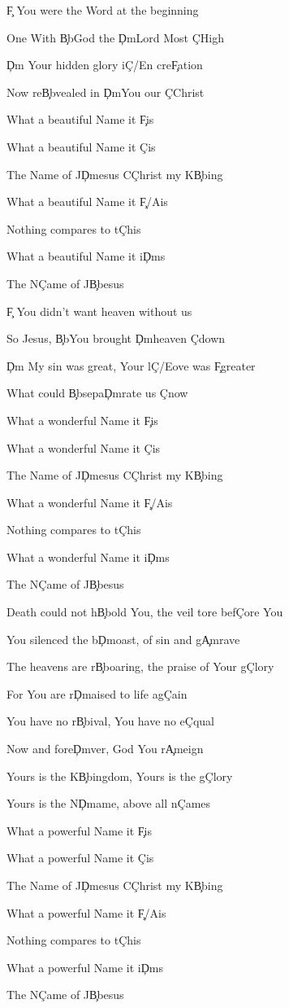 \documentclass[9pt]{extarticle}
\begin{document}
\bsong

\bv
\c{F} You were the Word at the beginning

One With \c{Bb}God the \c{Dm}Lord Most \c{C}High

\c{Dm} Your hidden glory i\c{C/E}n cre\c{F}ation

Now re\c{Bb}vealed in \c{Dm}You our \c{C}Christ
\ev

\bc
What a beautiful Name it \c{F}is

What a beautiful Name it \c{C}is

The Name of J\c{Dm}esus C\c{C}hrist my K\c{Bb}ing

What a beautiful Name it \c{F/A}is

Nothing compares to t\c{C}his

What a beautiful Name it i\c{Dm}s

The N\c{C}ame of J\c{Bb}esus
\ec

\bv
\c{F} You didn't want heaven without us

So Jesus, \c{Bb}You brought \c{Dm}heaven \c{C}down

\c{Dm} My sin was great, Your l\c{C/E}ove was \c{F}greater

What could \c{Bb}sepa\c{Dm}rate us \c{C}now
\ev

\bc
What a wonderful Name it \c{F}is

What a wonderful Name it \c{C}is

The Name of J\c{Dm}esus C\c{C}hrist my K\c{Bb}ing

What a wonderful Name it \c{F/A}is

Nothing compares to t\c{C}his

What a wonderful Name it i\c{Dm}s

The N\c{C}ame of J\c{Bb}esus
\ec

\bb
Death could not h\c{Bb}old You, the veil tore bef\c{C}ore You

You silenced the b\c{Dm}oast, of sin and g\c{Am}rave

The heavens are r\c{Bb}oaring, the praise of Your g\c{C}lory

For You are r\c{Dm}aised to life ag\c{C}ain
\eb

\bb
You have no r\c{Bb}ival, You have no e\c{C}qual

Now and fore\c{Dm}ver, God You r\c{Am}eign

Yours is the K\c{Bb}ingdom, Yours is the g\c{C}lory

Yours is the N\c{Dm}ame, above all n\c{C}ames
\eb

\bc
What a powerful Name it \c{F}is

What a powerful Name it \c{C}is

The Name of J\c{Dm}esus C\c{C}hrist my K\c{Bb}ing

What a powerful Name it \c{F/A}is

Nothing compares to t\c{C}his

What a powerful Name it i\c{Dm}s

The N\c{C}ame of J\c{Bb}esus
\ec



\esong
\end{document}
